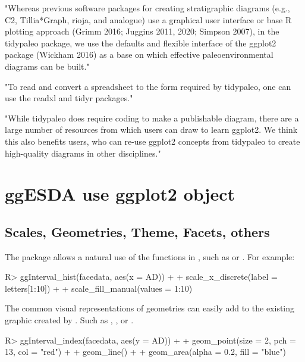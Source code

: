 \documentclass[article]{jss}
\begin{document}
"Whereas previous software packages for creating stratigraphic diagrams (e.g., C2, Tillia*Graph, rioja,
and analogue) use a graphical user interface or base R plotting approach (Grimm 2016; Juggins
2011, 2020; Simpson 2007), in the tidypaleo package, we use the defaults and flexible interface of the ggplot2 package (Wickham 2016) as a base on which effective paleoenvironmental
diagrams can be built."

"To read and convert a spreadsheet to the form required by tidypaleo, one can use the readxl and tidyr packages."


"While tidypaleo does require coding to make a publishable diagram, there are a large number of resources from which users can draw to learn ggplot2. We think this also benefits users, who can re-use ggplot2 concepts from tidypaleo to
create high-quality diagrams in other disciplines."


\section*{ggESDA use ggplot2 object}
\subsection{Scales, Geometries, Theme, Facets, others}

The  package allows a natural use of the  functions in , such as  or . For example:
\begin{CodeChunk}
\begin{CodeInput}
R> ggInterval_hist(facedata, aes(x = AD)) +
+      scale_x_discrete(label = letters[1:10]) +
+      scale_fill_manual(values = 1:10)
\end{CodeInput}
\end{CodeChunk}

The common visual representations of  geometries can easily add to the existing graphic created by . Such as , , or .
\begin{CodeChunk}
\begin{CodeInput}
R> ggInterval_index(facedata, aes(y = AD)) +
+      geom_point(size = 2, pch = 13, col = "red") +
+      geom_line() +
+      geom_area(alpha = 0.2, fill = "blue")
\end{CodeInput}
\end{CodeChunk}
\end{document}
